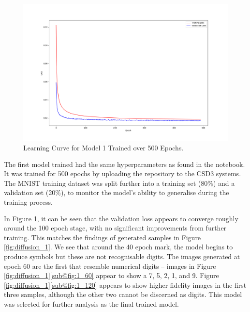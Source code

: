 \documentclass[12pt]{article}
\begin{document}
\begin{figure}[hp]
    \includegraphics[scale=0.35, center]{figures/learning_curve_1.png}
    \caption{Learning Curve for Model 1 Trained over 500 Epochs.}
    \label{fig:learning_curve_1}
\end{figure}

The first model trained had the same hyperparameters as found in the notebook.
It was trained for 500 epochs by uploading the repository to the CSD3 systems.
The MNIST training dataset was split further into a training set (80\%) and a validation set (20\%),
to monitor the model's ability to generalise during the training process.

In Figure \ref{fig:learning_curve_1}, it can be seen that the validation loss appears to converge roughly around the 100 epoch stage,
with no significant improvements from further training.
This matches the findings of generated samples in Figure \ref{fig:diffusion_1}.
We see that around the 40 epoch mark, the model begins to produce symbols but these are not recognisable digits.
The images generated at epoch 60 are the first that resemble numerical digits --
images in Figure \ref{fig:diffusion_1}\ref{sub@fig:1_60} appear to show a 7, 5, 2, 1, and 9.
Figure \ref{fig:diffusion_1}\ref{sub@fig:1_120} appears to show higher fidelity images in the first three samples,
although the other two cannot be discerned as digits.
This model was selected for further analysis as the final trained model.
\end{document}
